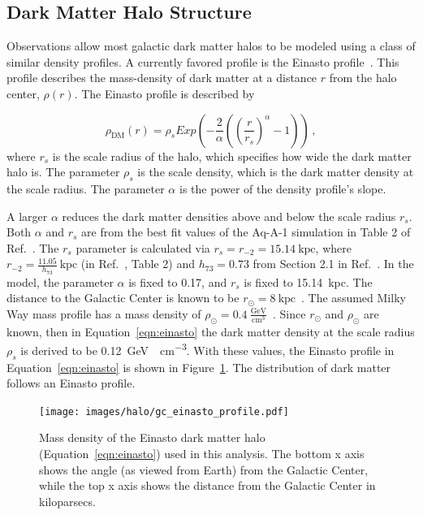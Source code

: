   \subsection{Dark Matter Halo Structure}\label{dm_spatial}
    
    Observations allow most galactic dark matter halos to be modeled using a class of similar density profiles.
    A currently favored profile is the Einasto profile~\cite{einastoprofile1,einastoprofile2}.
    This profile describes the mass-density of dark matter at a distance $r$ from the halo center, $\rho(r)$.
    The Einasto profile is described by

    \begin{equation} \label{eqn:einasto}
      \rho_{\textrm{DM}} \left( r \right) = \rho_{s} Exp \left( - \frac{2}{\alpha} \left( {\left( \frac{r}{r_s} \right)}^{\alpha} - 1 \right) \right) \,,
    \end{equation}
    where $r_s$ is the scale radius of the halo, which specifies how wide the dark matter halo is.
    The parameter $\rho_s$ is the scale density, which is the dark matter density at the scale radius.
    The parameter $\alpha$ is the power of the density profile's slope.
    
    A larger $\alpha$ reduces the dark matter densities above and below the scale radius $r_s$.
    Both $\alpha$ and $r_s$ are from the best fit values of the Aq-A-1 simulation in Table 2 of Ref.~\cite{mw_halo_params}.
    The $r_s$ parameter is calculated via $r_s=r_{-2}=15.14\:\textrm{kpc}$, where $r_{-2}=\frac{11.05}{h_{73}}\:\textrm{kpc}$ (in Ref.~\cite{mw_halo_params}, Table 2) and $h_{73}=0.73$ from Section 2.1 in Ref.~\cite{mw_halo_params}.
    In the model, the parameter $\alpha$ is fixed to 0.17, and $r_s$ is fixed to \SI{15.14}{kpc}.
    The distance to the Galactic Center is known to be $r_\odot=8\:\textrm{kpc}$~\cite{gc_distance_1,gc_distance_2,gc_distance_3}.
    The assumed Milky Way mass profile has a mass density of $\rho_\odot = 0.4\:\frac{\textrm{GeV}}{\textrm{cm}^3}$~\cite{local_dm_density,direct_dm_astrophysical_uncertainties}.
    Since $r_\odot$ and $\rho_\odot$ are known, then in Equation~\ref{eqn:einasto} the dark matter density at the scale radius $\rho_s$ is derived to be \SI{0.12}{\GeV{}\per\cm^3}.
    With these values, the Einasto profile in Equation~\ref{eqn:einasto} is shown in Figure~\ref{fig:gchalo_density}.
    The distribution of dark matter follows an Einasto profile.
  
    \begin{figure}[!t]
      \centering
      \texttt{[image: images/halo/gc\_einasto\_profile.pdf]}
      \caption[Galactic Center Einasto Halo Density]{
        Mass density of the Einasto dark matter halo (Equation~\ref{eqn:einasto}) used in this analysis.
        The bottom x axis shows the angle (as viewed from Earth) from the Galactic Center, while the top x axis shows the distance from the Galactic Center in kiloparsecs.
        \CaptionBlankLine
        }
      \label{fig:gchalo_density}
    \end{figure}

